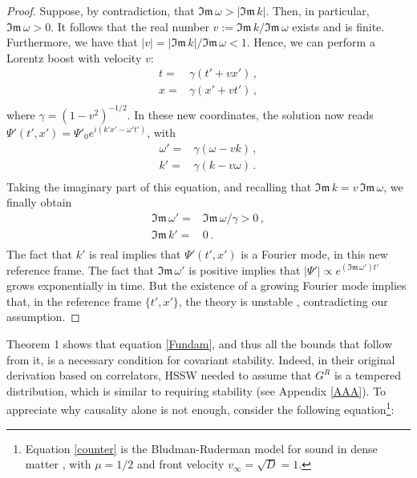 \documentclass[a4paper, amsfonts, amssymb, amsmath, reprint, showkeys, nofootinbib, twoside,notitlepage]{revtex4-1}
\theoremstyle{definition}
\theoremstyle{theorem}
\theoremstyle{corollary}
\begin{document}
\begin{proof}
Suppose, by contradiction, that $\mathfrak{Im}\, \omega > |\mathfrak{Im} \, k|$. Then, in particular, $\mathfrak{Im}\, \omega >0$. It follows that the real number $v:=\mathfrak{Im} \, k/\mathfrak{Im} \, \omega$ exists and is finite. Furthermore, we have that $|v|=|\mathfrak{Im} \, k|/\mathfrak{Im}\, \omega <1$. Hence, we can perform a Lorentz boost with velocity $v$:
\begin{equation}\label{Boost}
\begin{split}
t={}& \gamma (t'+vx') \, ,\\
x={}& \gamma (x'+vt') \, ,\\
\end{split}
\end{equation}
where $\gamma=(1-v^2)^{-1/2}$. In these new coordinates, the solution now reads $\Psi'(t',x') =\Psi'_0 e^{i(k'x'-\omega' t')}$, with 
\begin{equation}
\begin{split}
\omega'={}& \gamma (\omega-vk) \, ,\\
k'={}& \gamma (k-v\omega) \, .\\
\end{split}
\end{equation}
Taking the imaginary part of this equation, and recalling that $\mathfrak{Im} \, k = v \, \mathfrak{Im}\, \omega$, we finally obtain
\begin{equation}
\begin{split}
\mathfrak{Im} \, \omega'={}& \mathfrak{Im} \, \omega/\gamma >0 \, ,\\
\mathfrak{Im} \, k'={}& 0 \, .\\
\end{split}
\end{equation}
The fact that $k'$ is real implies that $\Psi'(t',x')$ is a Fourier mode, in this new reference frame. The fact that $\mathfrak{Im} \, \omega'$ is positive implies that $|\Psi'| \propto e^{(\mathfrak{Im} \, \omega')t'}$ grows exponentially in time. But the existence of a growing Fourier mode implies that, in the reference frame $\{t',x'\}$, the theory is unstable \cite{Hiscock_Insatibility_first_order}, contradicting our assumption.
\end{proof}
Theorem 1 shows that equation \eqref{Fundam}, and thus all the bounds that follow from it, is a necessary condition for covariant stability. Indeed, in their original derivation based on correlators, HSSW \cite{Heller2022} needed to assume that $G^R$ is a tempered distribution, which is similar to requiring stability (see Appendix \ref{AAA}). To appreciate why causality alone is not enough, consider the following equation\footnote{Equation \eqref{counter} is the Bludman-Ruderman model for sound in dense matter \cite{Bludman1968,FoxKuper1970}, with $\mu=1/2$ and front velocity $v_\infty=\sqrt{D}=1$.}:
\end{document}
